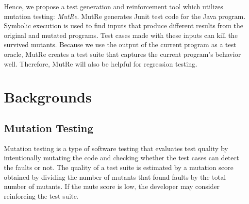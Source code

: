 \documentclass{article}
\begin{document}
Hence, we propose a test generation and reinforcement tool which utilizes mutation testing: \emph{MutRe}. MutRe generates Junit test code for the Java program. Symbolic execution is used to find inputs that produce different results from the original and mutated programs. Test cases made with these inputs can kill the survived mutants. Because we use the output of the current program as a test oracle, MutRe creates a test suite that captures the current program's behavior well. Therefore, MutRe will also be helpful for regression testing.

\iffalse
- Introduction
    최대한 이 주제에 관해 넓은 이야기를 하면 좋음.
    자연스럽게 Motivation으로 이끌어서 주제의 중요성을 어필
    현재 Mutation testing에서 불편한 점
    -> symbolic execution을 이용해서 이런 문제를 해결하는 툴을 제안
    -> 추가로 Regression testing 등에서 유용할 것이라는 예시(discussion에 들어가도 괜찮)
    앞부분은 https://www.notion.so/Proposal-c289e3fa36454c7dbca1e19d2e135091 참고
    뒷부분은 final presentation에서 했던 내용
 - Mutation testing은 많은 software에 적용되고 있으며, 더 많은 real world software에도 적용되고 있다.
 - 개발자는 mutation testing을 통해 test suite을 평가할 수 있다.
 - 그러나 test suite을 보강하려면 개발자가 직접 mutation 결과를 검토해야 한다.
 - 이는 이러한 단점이 있다. (e.g. mutation 수가 많고 software가 복잡할수록 test input을 찾기 어려워진다.)
 - 따라서 우리는 자동으로 mutation을 kill하는 input을 만드는 MutRe를 제안한다.
 - MutRe는 Java program을 대상으로 Junit code를 generate한다. 살아남은 mutant에 대해 symbolic execution을 이용해 original program과 mutated program이 다른 결과를 내는 input을 찾는다. 이러한 input으로 만든 test case는 mutant를 kill할 수 있다.
 - 현재 program의 output을 test oracle로 사용하기 때문에 현재 프로그램의 behavior를 잘 캡쳐하는 test suite을 만든다. 따라서 MutRe는 regression testing에도 유용할 것이다.
 
\fi

\section{Backgrounds}
\iffalse
간단하게 mutation testing이랑 RIP conditions에 대해서
두세 문단 정도면 될 거 같네요
 - mutation testing 정의, mutation score 설명
 - RIP condition 설명
\fi
\subsection{Mutation Testing}
Mutation testing is a type of software testing that evaluates test quality by intentionally mutating the code and checking whether the test cases can detect the faults or not. The quality of a test suite is estimated by a mutation score obtained by dividing the number of mutants that found faults by the total number of mutants. If the mute score is low, the developer may consider reinforcing the test suite.
\end{document}
